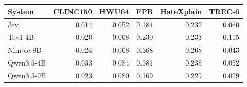 \begin{tabular}{lrrrrr}
\toprule
System & CLINC150 & HWU64 & FPB & HateXplain & TREC-6 \\
\midrule
Jev & 0.014 & 0.052 & 0.184 & 0.232 & 0.060 \\
Tev1-4B & 0.020 & 0.068 & 0.230 & 0.233 & 0.115 \\
Nimble-9B & 0.024 & 0.068 & 0.368 & 0.268 & 0.043 \\
Qwen3.5-4B & 0.033 & 0.084 & 0.381 & 0.238 & 0.052 \\
Qwen3.5-9B & 0.023 & 0.080 & 0.169 & 0.229 & 0.029 \\
\bottomrule
\end{tabular}
